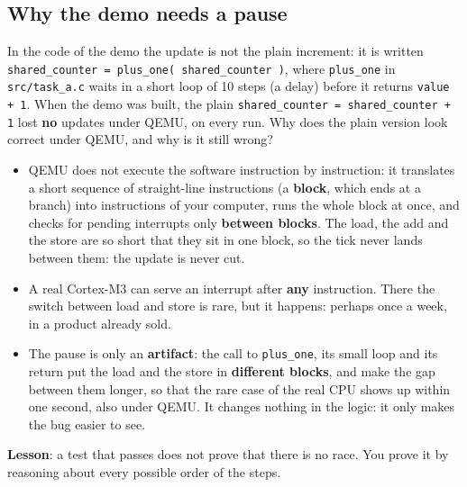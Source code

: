 \subsection{Why the demo needs a pause}
In the code of the demo the update is not the plain increment: it is written \texttt{shared\_counter = plus\_one( shared\_counter )}, where \texttt{plus\_one} in \texttt{src/task\_a.c} waits in a short loop of 10 steps (a delay) before it returns \texttt{value + 1}. When the demo was built, the plain \texttt{shared\_counter = shared\_counter + 1} lost \textbf{no} updates under QEMU, on every run. Why does the plain version look correct under QEMU, and why is it still wrong?
\begin{itemize}
    \item QEMU does not execute the software instruction by instruction: it translates a short sequence of straight-line instructions (a \textbf{block}, which ends at a branch) into instructions of your computer, runs the whole block at once, and checks for pending interrupts only \textbf{between blocks}. The load, the add and the store are so short that they sit in one block, so the tick never lands between them: the update is never cut.
    \item A real Cortex-M3 can serve an interrupt after \textbf{any} instruction. There the switch between load and store is rare, but it happens: perhaps once a week, in a product already sold.
    \item The pause is only an \textbf{artifact}: the call to \texttt{plus\_one}, its small loop and its return put the load and the store in \textbf{different blocks}, and make the gap between them longer, so that the rare case of the real CPU shows up within one second, also under QEMU. It changes nothing in the logic: it only makes the bug easier to see.
\end{itemize}
\textbf{Lesson}: a test that passes does not prove that there is no race. You prove it by reasoning about every possible order of the steps.

